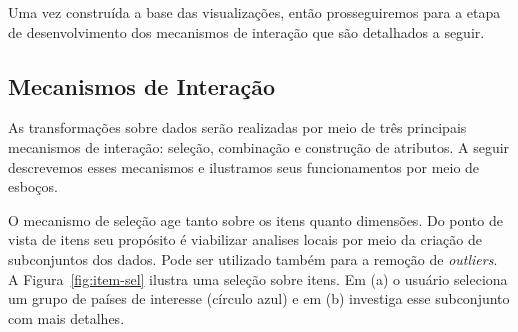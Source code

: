 % 
% 
% 
% 

Uma vez construída a base das visualizações, então
prosseguiremos para a etapa de desenvolvimento dos
mecanismos de interação que são detalhados a seguir.

\subsection{Mecanismos de Interação}

As transformações sobre dados serão realizadas
por meio de três principais mecanismos de interação:
seleção, combinação e construção de atributos. A seguir
descrevemos esses mecanismos e ilustramos seus
funcionamentos por meio de esboços.

O mecanismo de seleção age tanto sobre os itens quanto
dimensões. Do ponto de vista de itens seu propósito é
viabilizar analises locais por meio da criação de
subconjuntos dos dados. Pode ser utilizado também para a
remoção de \emph{outliers}. A Figura~\ref{fig:item-sel}
ilustra uma seleção sobre itens. Em (a) o usuário seleciona
um grupo de países de interesse (círculo azul) e em (b)
investiga esse subconjunto com mais detalhes. 

